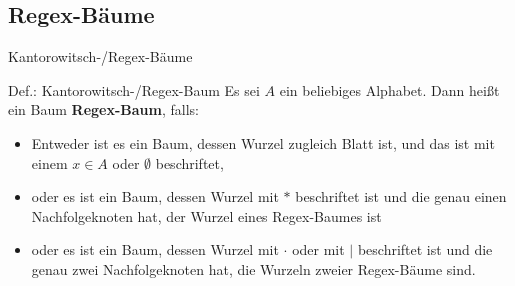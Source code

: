 \subsection{Regex-Bäume}
\begin{frame}{Kantorowitsch-/Regex-Bäume}
    \begin{block}{Def.: Kantorowitsch-/Regex-Baum}
    	Es sei $A$ ein beliebiges Alphabet. Dann heißt ein Baum \textbf{Regex-Baum}, falls:
    	\begin{itemize}
    		\item Entweder ist es ein Baum, dessen Wurzel zugleich Blatt ist, und das ist mit einem $x\in A$ oder $\emptyset$ beschriftet,
    		\item oder es ist ein Baum, dessen Wurzel mit $*$ beschriftet ist und die genau einen Nachfolgeknoten hat, der Wurzel eines Regex-Baumes ist
    		\item oder es ist ein Baum, dessen Wurzel mit $\cdot$ oder mit $|$ beschriftet ist und die genau zwei Nachfolgeknoten hat, die Wurzeln zweier Regex-Bäume sind. 
    	\end{itemize}
    \end{block}


      



    
\end{frame}

